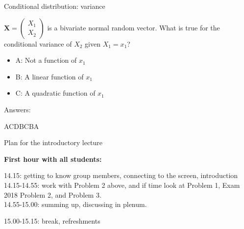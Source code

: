 \documentclass[ignorenonframetext,]{beamer}
\providecommand{\tightlist}{%
  \setlength{\itemsep}{0pt}\setlength{\parskip}{0pt}}
\begin{document}
\begin{frame}

\begin{block}{Conditional distribution: variance}

\(\mathbf{X}=\left(\begin{array}{r}X_1 \\X_2 \end{array}\right)\) is a
bivariate normal random vector. What is true for the conditional
variance of \(X_2\) given \(X_1=x_1\)?

\begin{itemize}
\tightlist
\item
  A: Not a function of \(x_1\)
\item
  B: A linear function of \(x_1\)
\item
  C: A quadratic function of \(x_1\)
\end{itemize}

\end{block}

\end{frame}

\begin{frame}

\begin{block}{Answers:}

ACDBCBA

\end{block}

\end{frame}

\begin{frame}{Plan for the introductory lecture}

\textbf{First hour with all students:}

14.15: getting to know group members, connecting to the screen,
introduction\\
14.15-14.55: work with Problem 2 above, and if time look at Problem 1,
Exam 2018 Problem 2, and Problem 3.\\
14.55-15.00: summing up, discussing in plenum.

15.00-15.15: break, refreshments

\end{frame}
\end{document}
